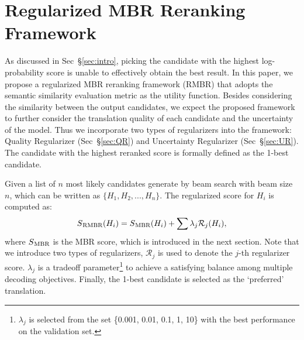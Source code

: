 \documentclass{article}
\begin{document}
\section{Regularized MBR Reranking Framework}
As discussed in Sec~\S\ref{sec:intro}, picking the candidate with the highest log-probability score is unable to effectively obtain the best result. %
In this paper, we propose a regularized MBR reranking framework (RMBR) that adopts the semantic similarity evaluation metric as the utility function. Besides considering the similarity between the output candidates, we expect the proposed framework to further consider the translation quality of each candidate and the uncertainty of the model. Thus we incorporate two types of regularizers into the framework: Quality Regularizer (Sec~\S\ref{sec:QR}) and Uncertainty Regularizer (Sec~\S\ref{sec:UR}). The candidate with the highest reranked score is formally defined as the 1-best candidate. 


Given a list of $n$ most likely candidates generate by beam search with beam size $n$, which can be written as $\{H_1,H_2,...,H_n\}$. %
The regularized score for $H_i$ is computed as:
\begin{equation}
S\textsubscript{RMBR}(H_i)=S\textsubscript{MBR}(H_i)+\sum \lambda_j \mathcal{R}_j(H_i),
\end{equation}
where $S\textsubscript{MBR}$ is the MBR score, which is introduced in the next section. Note that we introduce two types of regularizers, $\mathcal{R}_j$ is used to denote the $j$-th regularizer score. $\lambda_j$ is a tradeoff parameter\footnote{$\lambda_j$ is selected from the set \{0.001, 0.01, 0.1, 1, 10\} with the best performance on the validation set.} to achieve a satisfying balance among multiple decoding objectives. Finally, the 1-best candidate is selected as the ‘preferred’ translation. 

\end{document}
